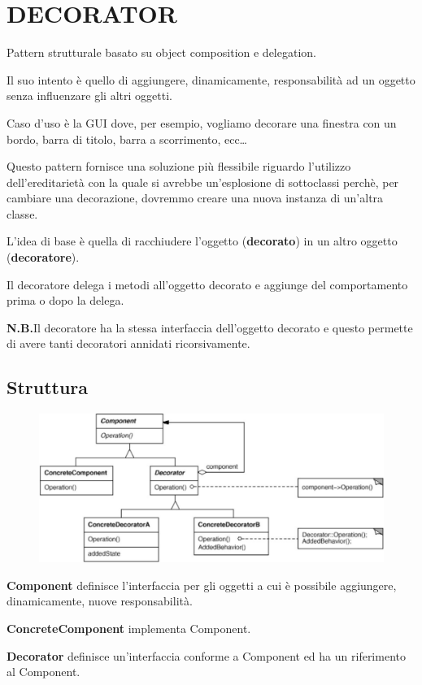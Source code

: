 \chapter{DECORATOR}

Pattern strutturale basato su object composition e delegation.

Il suo intento è quello di aggiungere,  dinamicamente, responsabilità ad un oggetto senza influenzare gli altri oggetti. 

Caso d'uso è la GUI dove, per esempio, vogliamo decorare una finestra con un bordo, barra di titolo, barra a scorrimento, ecc\dots

Questo pattern fornisce una soluzione più flessibile riguardo l'utilizzo dell'ereditarietà con la quale si avrebbe un'esplosione di sottoclassi perchè, per cambiare 
una decorazione, dovremmo creare una nuova instanza di un'altra classe.

L'idea di base è quella di racchiudere l'oggetto (\textbf{decorato}) in un altro oggetto (\textbf{decoratore}).

Il decoratore delega i metodi all'oggetto decorato e aggiunge del comportamento prima o dopo la delega.

\medskip
\textbf{N.B.}Il decoratore ha la stessa interfaccia dell'oggetto decorato e questo permette di avere tanti decoratori annidati ricorsivamente.

\section{Struttura}

\begin{figure}[H]
    \centering
    \includegraphics[width=0.5\linewidth]{../../immagini/decorator/struttura_decorator}    
\end{figure}

\textbf{Component} definisce l'interfaccia per gli oggetti a cui è possibile aggiungere, dinamicamente, nuove responsabilità.

\textbf{ConcreteComponent} implementa Component.

\textbf{Decorator} definisce un'interfaccia conforme a Component ed ha un riferimento al Component.


